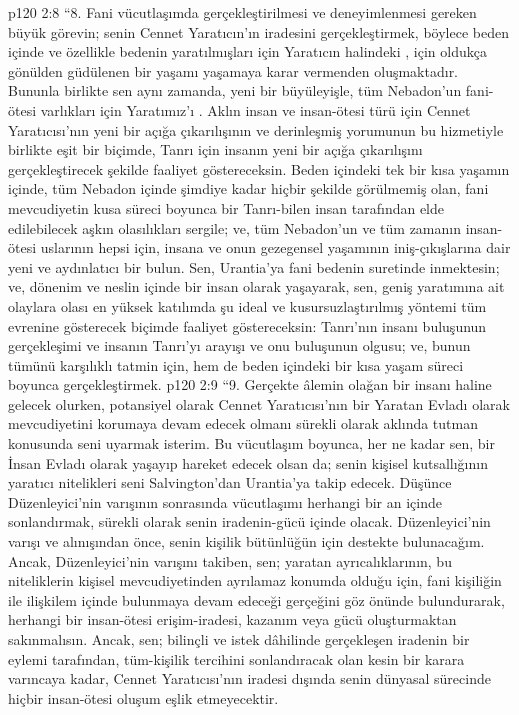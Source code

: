 \vs p120 2:8 “8. Fani vücutlaşımda gerçekleştirilmesi ve deneyimlenmesi gereken büyük görevin; senin Cennet Yaratıcın’ın iradesini gerçekleştirmek, böylece beden içinde ve özellikle bedenin yaratılmışları için Yaratıcın halindeki , için oldukça gönülden güdülenen bir yaşamı yaşamaya karar vermenden oluşmaktadır. Bununla birlikte sen aynı zamanda, yeni bir büyüleyişle, tüm Nebadon’un fani\hyp{}ötesi varlıkları için Yaratımız’ı . Aklın insan ve insan\hyp{}ötesi türü için Cennet Yaratıcısı’nın yeni bir açığa çıkarılışının ve derinleşmiş yorumunun bu hizmetiyle birlikte eşit bir biçimde, Tanrı için insanın yeni bir açığa çıkarılışını gerçekleştirecek şekilde faaliyet göstereceksin. Beden içindeki tek bir kısa yaşamın içinde, tüm Nebadon içinde şimdiye kadar hiçbir şekilde görülmemiş olan, fani mevcudiyetin kusa süreci boyunca bir Tanrı\hyp{}bilen insan tarafından elde edilebilecek aşkın olasılıkları sergile; ve, tüm Nebadon’un ve tüm zamanın insan\hyp{}ötesi uslarının hepsi için, insana ve onun gezegensel yaşamının iniş\hyp{}çıkışlarına dair yeni ve aydınlatıcı bir  bulun. Sen, Urantia’ya fani bedenin suretinde inmektesin; ve, dönenim ve neslin içinde bir insan olarak yaşayarak, sen, geniş yaratımına ait olaylara olası en yüksek katılımda şu ideal ve kusursuzlaştırılmış yöntemi tüm evrenine gösterecek biçimde faaliyet göstereceksin: Tanrı’nın insanı buluşunun gerçekleşimi ve insanın Tanrı’yı arayışı ve onu buluşunun olgusu; ve, bunun tümünü karşılıklı tatmin için, hem de beden içindeki bir kısa yaşam süreci boyunca gerçekleştirmek.
\vs p120 2:9 “9. Gerçekte âlemin olağan bir insanı haline gelecek olurken, potansiyel olarak Cennet Yaratıcısı’nın bir Yaratan Evladı olarak mevcudiyetini korumaya devam edecek olmanı sürekli olarak aklında tutman konusunda seni uyarmak isterim. Bu vücutlaşım boyunca, her ne kadar sen, bir İnsan Evladı olarak yaşayıp hareket edecek olsan da; senin kişisel kutsallığının yaratıcı nitelikleri seni Salvington’dan Urantia’ya takip edecek. Düşünce Düzenleyici’nin varışının sonrasında vücutlaşımı herhangi bir an içinde sonlandırmak, sürekli olarak senin iradenin\hyp{}gücü içinde olacak. Düzenleyici’nin varışı ve alınışından önce, senin kişilik bütünlüğün için destekte bulunacağım. Ancak, Düzenleyici’nin varışını takiben, sen; yaratan ayrıcalıklarının, bu niteliklerin kişisel mevcudiyetinden ayrılamaz konumda olduğu için, fani kişiliğin ile ilişkilem içinde bulunmaya devam edeceği gerçeğini göz önünde bulundurarak, herhangi bir insan\hyp{}ötesi erişim\hyp{}iradesi, kazanım veya gücü oluşturmaktan sakınmalısın. Ancak, sen; bilinçli ve istek dâhilinde gerçekleşen iradenin bir eylemi tarafından, tüm\hyp{}kişilik tercihini sonlandıracak olan kesin bir karara varıncaya kadar, Cennet Yaratıcısı’nın iradesi dışında senin dünyasal sürecinde hiçbir insan\hyp{}ötesi oluşum eşlik etmeyecektir.

